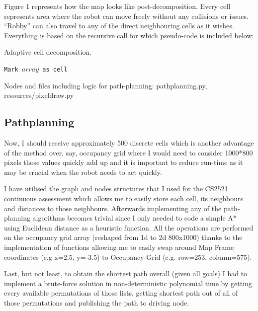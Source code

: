 \documentclass[a4paper]{article}
\begin{document}
Figure 1 represents how the map looks like post-decomposition. Every cell represents area where the robot can move freely without any collisions or issues. \textquotedblleft{}Robby\textquotedblright{} can also travel to any of the direct neighbouring cells as it wishes. Everything is based on the recursive call for which pseudo-code is included below:
\begin{algorithm}[H]
    \caption{Adaptive cell decomposition.}
    \begin{algorithmic}[1]
                \State \texttt{Mark $array$ as cell}
                \State \Return
            \Else
            \EndIf
        \EndProcedure
    \end{algorithmic}
\end{algorithm}
Nodes and files including logic for path-planning: pathplanning.py, resources/pixeldraw.py

\subsection{Pathplanning}
Now, I should receive approximately 500 discrete cells \textendash{} which is another advantage of the method over, say, occupancy grid where I would need to consider 1000*800 pixels \textendash{} those values quickly add up and it is important to reduce run-time as it may be crucial when the robot needs to act quickly.

I have utilised the graph and nodes structures that I used for the CS2521 continuous assessment which allows me to easily store each cell, its neighbours and distances to those neighbours. Afterwards implementing any of the path-planning algorithms becomes trivial since I only needed to code a simple A* using Euclidean distance as a heuristic function. All the operations are performed on the occupancy grid array (reshaped from 1d to 2d \textendash{} 800x1000) thanks to the implementation of functions allowing me to easily swap around Map Frame coordinates (e.g x=2.5, y=-3.5) to Occupancy Grid (e.g. row=253, column=575).

Last, but not least, to obtain the shortest path overall (given all goals) I had to implement a brute-force solution in non-deterministic polynomial time by getting every available permutations of those lists, getting shortest path out of all of those permutations and publishing the path to driving node.
\end{document}
